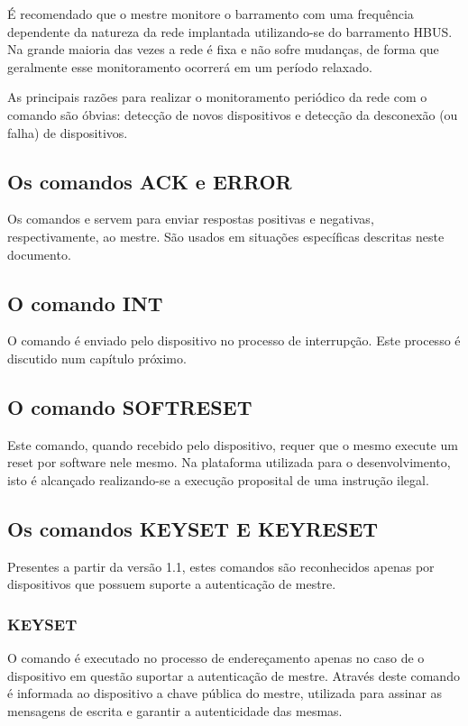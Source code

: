 \documentclass[11pt]{report}
\begin{document}
É recomendado que o mestre monitore o barramento com uma frequência dependente da natureza da rede implantada utilizando-se do barramento HBUS. Na grande maioria das vezes a rede é fixa e não sofre mudanças, de forma que geralmente esse monitoramento ocorrerá em um período relaxado.

As principais razões para realizar o monitoramento periódico da rede com o comando  são óbvias:
detecção de novos dispositivos e detecção da desconexão (ou falha) de dispositivos.

\subsection{Os comandos ACK e ERROR}

Os comandos  e  servem para enviar respostas positivas e negativas, respectivamente, ao mestre. São usados em situações específicas descritas neste documento.

\subsection{O comando INT}

O comando  é enviado pelo dispositivo no processo de interrupção. Este processo é discutido num capítulo próximo.

\subsection{O comando SOFTRESET}

Este comando, quando recebido pelo dispositivo, requer que o mesmo execute um reset por software nele mesmo.
Na plataforma utilizada para o desenvolvimento, isto é alcançado realizando-se a execução proposital de uma instrução ilegal.

\subsection{Os comandos KEYSET E KEYRESET}

Presentes a partir da versão 1.1, estes comandos são reconhecidos apenas por dispositivos que possuem suporte a autenticação de mestre.

\subsubsection{KEYSET}

O comando  é executado no processo de endereçamento apenas no caso de o dispositivo em questão suportar a autenticação de mestre. Através deste comando é informada ao dispositivo a chave pública do mestre, utilizada para assinar as mensagens de escrita e garantir a autenticidade das mesmas.
\end{document}
